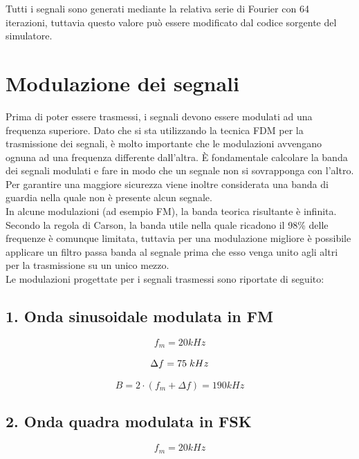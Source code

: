 \documentclass{article}
\begin{document}
Tutti i segnali sono generati mediante la relativa serie di Fourier con 64 iterazioni, tuttavia questo valore può essere
modificato dal codice sorgente del simulatore.

\section{Modulazione dei segnali}
Prima di poter essere trasmessi, i segnali devono essere modulati ad una frequenza superiore. Dato che si sta utilizzando la
tecnica FDM per la trasmissione dei segnali, è molto importante che le modulazioni avvengano ognuna ad una frequenza differente
dall'altra. È fondamentale calcolare la banda dei segnali modulati e fare in modo che un segnale non si sovrapponga con l'altro.
Per garantire una maggiore sicurezza viene inoltre considerata una banda di guardia nella quale non è presente alcun segnale.\\
In alcune modulazioni (ad esempio FM), la banda teorica risultante è infinita. Secondo la regola di Carson, la banda utile nella
quale ricadono il 98\% delle frequenze è comunque limitata, tuttavia per una modulazione migliore è possibile applicare un filtro
passa banda al segnale prima che esso venga unito agli altri per la trasmissione su un unico mezzo.\\

Le modulazioni progettate per i segnali trasmessi sono riportate di seguito:

\subsection{1. Onda sinusoidale modulata in FM}
\begin{equation}
    f_m = 20 kHz
\end{equation}

\begin{equation}
    \Delta f = 75 \hspace{0.1cm} kHz
\end{equation}

\begin{equation}
    B = 2 \cdot (f_m + \Delta f) = 190 kHz
\end{equation}

\subsection{2. Onda quadra modulata in FSK}
\begin{equation}
    f_m = 20 kHz
\end{equation}
\end{document}
